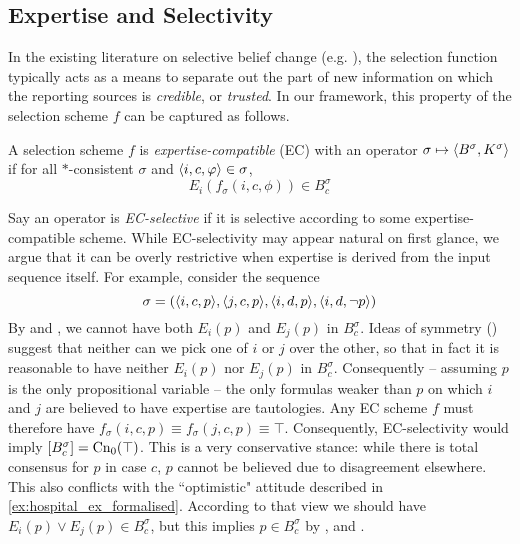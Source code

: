 \subsection{Expertise and Selectivity}

In the existing literature on selective belief change (e.g.
\cite{ferme1999selective,booth_trust_2018}), the selection function typically
acts as a means to separate out the part of new information on which the
reporting sources is \emph{credible}, or \emph{trusted}. In our framework, this
property of the selection scheme $f$ can be captured as follows.

\begin{definition}
    \label{def:ec_scheme}
    A selection scheme $f$ is \emph{expertise-compatible} (EC) with an operator
    $\sigma \mapsto \langle {B^\sigma, K^\sigma} \rangle$ if for all $\ast$-consistent
    $\sigma$ and $\langle {i, c, \varphi} \rangle \in \sigma$,
    \[
        E_i(f_\sigma(i, c, \phi)) \in B^\sigma_c
    \]
\end{definition}

Say an operator is \emph{EC-selective} if it is selective according to some
expertise-compatible scheme. While EC-selectivity may appear natural on first
glance, we argue that it can be overly restrictive when expertise is derived
from the input sequence itself. For example, consider the sequence
\[
    \sigma = (
        \langle {i, c, p} \rangle,
        \langle {j, c, p} \rangle,
        \langle {i, d, p} \rangle,
        \langle {i, d, \neg p} \rangle
    )
\]
By \soundness{} and \closure{}, we cannot have both $E_i(p)$ and $E_j(p)$ in
$B^\sigma_c$. Ideas of symmetry () suggest that neither can we pick one of $i$ or
$j$ over the other, so that in fact it is reasonable to have neither $E_i(p)$
nor $E_j(p)$ in $B^\sigma_c$. Consequently -- assuming $p$ is the only
propositional variable -- the only formulas weaker than $p$ on which $i$ and
$j$ are believed to have expertise are tautologies. Any EC scheme $f$ must
therefore have $f_\sigma(i, c, p) \equiv f_\sigma(j, c, p) \equiv \top$.
Consequently, EC-selectivity would imply $\left[{B^\sigma_c}\right] =
\operatorname{Cn}_0(\top)$. This is a very conservative stance: while there is total
consensus for $p$ in case $c$, $p$ cannot be believed due to disagreement
elsewhere. This also conflicts with the ``optimistic" attitude described in
\cref{ex:hospital_ex_formalised}. According to that view we should have $E_i(p)
\lor E_j(p) \in B^\sigma_c$, but this implies $p \in B^\sigma_c$ by
\soundness{}, \containment{} and \closure{}.

